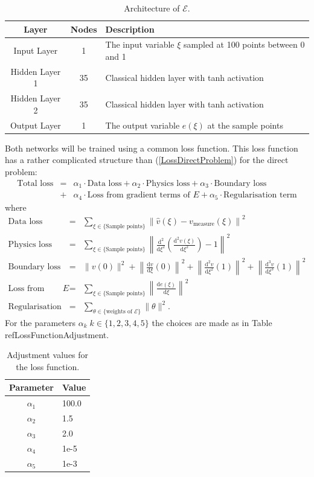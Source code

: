 \documentclass[a4paper,11pt]{article}
\begin{document}
\begin{table}[h!]
\centering
\begin{tabular}{ccl}
\toprule
\textbf{Layer} & \textbf{Nodes} & \textbf{Description}\\
\midrule
Input Layer & 1 & The input variable $\xi $ sampled at 100 points between 0 and 1\\
Hidden Layer 1 & 35 & Classical hidden layer with tanh activation\\
Hidden Layer  2& 35 & Classical hidden layer with tanh activation\\
Output Layer & 1 & The output variable $e(\xi ) $ at the sample points\\
\bottomrule
\end{tabular}
\caption{Architecture of $\mathscr{E}$.}
\end{table}
Both networks will be trained using a common loss function. This loss function has a rather complicated structure than (\ref{LossDirectProblem}) for the direct problem:
\begin{eqnarray*}
\text{Total loss} & = &  \alpha_1 \cdot \text{Data loss} + \alpha_2 \cdot \text{Physics loss} + \alpha_3 \cdot\text{Boundary loss} \\
& + &  \alpha_4 \cdot \text{Loss from gradient terms of } E +\alpha_5 \cdot\text{Regularisation term}
\end{eqnarray*}
where
\begin{eqnarray*}
\text{Data loss} & = & \sum_{\xi \in \{\text{Sample points}\}} \left\| \hat{v}(\xi) - v_{\mathrm{measure}} (\xi ) \right\|^2 \\
\text{Physics loss} & = & \sum_{\xi \in \{\text{Sample points}\}} \left\|  \tfrac{\mathrm{d}^2}{\mathrm{d}\xi^2} \left(  \tfrac{\mathrm{d}^2 v(\xi)}{\mathrm{d}\xi^2} \right)-1  \right\|^2 \\
\text{Boundary loss}  & = & \| v (0) \|^2 + \left\|\tfrac{\mathrm{d} v}{\mathrm{d}\xi}(0) \right\|^2 + \left\|\tfrac{\mathrm{d}^2 v}{\mathrm{d}\xi^2} (1) \right\|^2 + \left\|\tfrac{\mathrm{d}^3 v}{\mathrm{d}\xi^3}(1) \right\|^2 \\
\text{Loss from gradient terms of } E  & = & \sum_{\xi \in \{\text{Sample points}\}} \left\|  \tfrac{\mathrm{d} e ( \xi ) }{\mathrm{d}\xi} \right\|^2 \\
\text{Regularisation term} & = & \sum_{\theta \in \{\text{weights of }\mathscr{E}\}} \| \theta \|^2 .
\end{eqnarray*}
For the parameters $ \alpha_k \; k\in\{1,2,3,4,5\} $ the choices are made as in Table ref{LossFunctionAdjustment}.
\begin{table}[h!]
\centering
\begin{tabular}{cl}
\toprule
\textbf{Parameter} & \textbf{Value}\\
\midrule
$ \alpha_1 $ & 100.0 \\
$ \alpha_2 $ & 1.5 \\
$ \alpha_3 $ & 2.0 \\
$ \alpha_4 $ & 1e-5 \\
$ \alpha_5 $ & 1e-3 \\
\bottomrule
\end{tabular}
\caption{Adjustment values for the loss function.}
\label{LossFunctionAdjustment}
\end{table}
\end{document}
